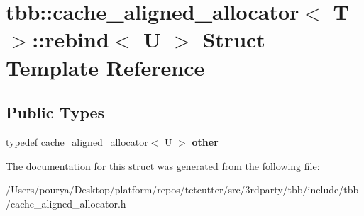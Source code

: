 \hypertarget{structtbb_1_1cache__aligned__allocator_1_1rebind}{}\section{tbb\+:\+:cache\+\_\+aligned\+\_\+allocator$<$ T $>$\+:\+:rebind$<$ U $>$ Struct Template Reference}
\label{structtbb_1_1cache__aligned__allocator_1_1rebind}
\subsection*{Public Types}
\begin{DoxyCompactItemize}
\item 
\hypertarget{structtbb_1_1cache__aligned__allocator_1_1rebind_a1bb89d2224e26a9dfee7ef1adbac8b3d}{}typedef \hyperlink{classtbb_1_1cache__aligned__allocator}{cache\+\_\+aligned\+\_\+allocator}$<$ U $>$ {\bfseries other}\label{structtbb_1_1cache__aligned__allocator_1_1rebind_a1bb89d2224e26a9dfee7ef1adbac8b3d}

\end{DoxyCompactItemize}


The documentation for this struct was generated from the following file\+:\begin{DoxyCompactItemize}
\item 
/\+Users/pourya/\+Desktop/platform/repos/tetcutter/src/3rdparty/tbb/include/tbb/cache\+\_\+aligned\+\_\+allocator.\+h\end{DoxyCompactItemize}
